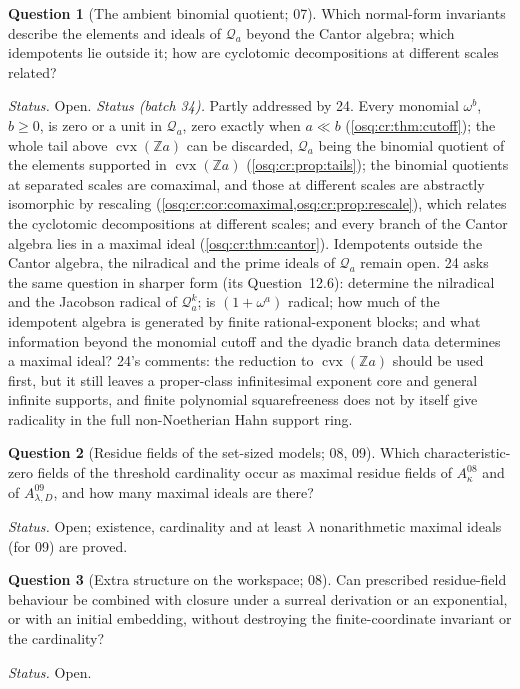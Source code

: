 \documentclass[11pt,letterpaper]{article}
\numberwithin{equation}{section}
\theoremstyle{definition}
\newtheorem{question}[question]{Question}
\theoremstyle{remark}
\theoremstyle{plain}
\newcommand{\Z}{\mathbb Z}
\newcommand{\Qa}{\mathcal Q}         %
\begin{document}
\begin{question}[The ambient binomial quotient; 07]\label{osq:q:binomial}
Which normal-form invariants describe the elements and ideals of $\Qa_a$ beyond the Cantor algebra;
which idempotents lie outside it; how are cyclotomic decompositions at different scales related?
\end{question}
\emph{Status.} Open. \emph{Status (batch 34).} Partly addressed by 24. Every monomial $\omega^b$, $b\ge0$, is zero or a unit in $\Qa_a$, zero exactly
when $a\ll b$ (\cref{osq:cr:thm:cutoff}); the whole tail above $\operatorname{cvx}(\Z a)$ can be discarded, $\Qa_a$ being the binomial quotient of the
elements supported in $\operatorname{cvx}(\Z a)$ (\cref{osq:cr:prop:tails}); the binomial quotients at separated scales are comaximal, and those at
different scales are abstractly isomorphic by rescaling (\cref{osq:cr:cor:comaximal,osq:cr:prop:rescale}), which relates the cyclotomic decompositions
at different scales; and every branch of the Cantor algebra lies in a maximal ideal (\cref{osq:cr:thm:cantor}). Idempotents outside the Cantor algebra,
the nilradical and the prime ideals of $\Qa_a$ remain open. 24 asks the same question in sharper form (its Question~12.6): determine the nilradical and
the Jacobson radical of $\Qa^k_a$; is $(1+\omega^a)$ radical; how much of the idempotent algebra is generated by finite rational-exponent blocks; and what
information beyond the monomial cutoff and the dyadic branch data determines a maximal ideal? 24's comments: the reduction to
$\operatorname{cvx}(\Z a)$ should be used first, but it still leaves a proper-class infinitesimal exponent core and general infinite supports, and finite
polynomial squarefreeness does not by itself give radicality in the full non-Noetherian Hahn support ring.

\begin{question}[Residue fields of the set-sized models; 08, 09]\label{osq:q:residue}
Which characteristic-zero fields of the threshold cardinality occur as maximal residue fields of
$A^{08}_\kappa$ and of $A^{09}_{\lambda,D}$, and how many maximal ideals are there?
\end{question}
\emph{Status.} Open; existence, cardinality and at least $\lambda$ nonarithmetic maximal ideals
(for 09) are proved.

\begin{question}[Extra structure on the workspace; 08]\label{osq:q:extra}
Can prescribed residue-field behaviour be combined with closure under a surreal derivation or an
exponential, or with an initial embedding, without destroying the finite-coordinate invariant or the
cardinality?
\end{question}
\emph{Status.} Open.
\end{document}
